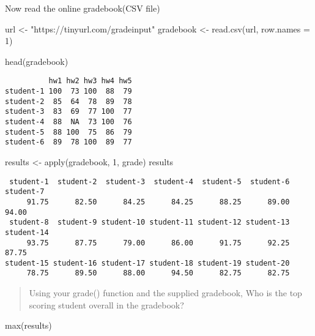 \documentclass[
  letterpaper,
  DIV=11,
  numbers=noendperiod]{scrartcl}
\newenvironment{Shaded}{\begin{snugshade}}{\end{snugshade}}
\newcommand{\AttributeTok}[1]{\textcolor[rgb]{0.40,0.45,0.13}{#1}}
\newcommand{\DecValTok}[1]{\textcolor[rgb]{0.68,0.00,0.00}{#1}}
\newcommand{\FunctionTok}[1]{\textcolor[rgb]{0.28,0.35,0.67}{#1}}
\newcommand{\NormalTok}[1]{\textcolor[rgb]{0.00,0.23,0.31}{#1}}
\newcommand{\OtherTok}[1]{\textcolor[rgb]{0.00,0.23,0.31}{#1}}
\newcommand{\StringTok}[1]{\textcolor[rgb]{0.13,0.47,0.30}{#1}}
\begin{document}
Now read the online gradebook(CSV file)

\begin{Shaded}
\begin{Highlighting}[]
\NormalTok{url }\OtherTok{\textless{}{-}} \StringTok{"https://tinyurl.com/gradeinput"}
\NormalTok{gradebook }\OtherTok{\textless{}{-}} \FunctionTok{read.csv}\NormalTok{(url, }\AttributeTok{row.names =} \DecValTok{1}\NormalTok{)}

\FunctionTok{head}\NormalTok{(gradebook)}
\end{Highlighting}
\end{Shaded}

\begin{verbatim}
          hw1 hw2 hw3 hw4 hw5
student-1 100  73 100  88  79
student-2  85  64  78  89  78
student-3  83  69  77 100  77
student-4  88  NA  73 100  76
student-5  88 100  75  86  79
student-6  89  78 100  89  77
\end{verbatim}

\begin{Shaded}
\begin{Highlighting}[]
\NormalTok{results }\OtherTok{\textless{}{-}} \FunctionTok{apply}\NormalTok{(gradebook, }\DecValTok{1}\NormalTok{, grade)}
\NormalTok{results}
\end{Highlighting}
\end{Shaded}

\begin{verbatim}
 student-1  student-2  student-3  student-4  student-5  student-6  student-7 
     91.75      82.50      84.25      84.25      88.25      89.00      94.00 
 student-8  student-9 student-10 student-11 student-12 student-13 student-14 
     93.75      87.75      79.00      86.00      91.75      92.25      87.75 
student-15 student-16 student-17 student-18 student-19 student-20 
     78.75      89.50      88.00      94.50      82.75      82.75 
\end{verbatim}

\begin{quote}
Using your grade() function and the supplied gradebook, Who is the top
scoring student overall in the gradebook?
\end{quote}

\begin{Shaded}
\begin{Highlighting}[]
\FunctionTok{max}\NormalTok{(results)}
\end{Highlighting}
\end{Shaded}
\end{document}
